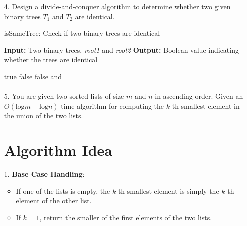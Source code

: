 \documentclass{article}
\begin{document}
\begin{itemize}
\item[4.] Design a divide-and-conquer algorithm to determine whether two given binary trees $T_1$ and $T_2$ are identical.

\begin{center}
\begin{algorithm}
  \caption{isSameTree: Check if two binary trees are identical}
  \begin{algorithmic}[1] %
      \State \textbf{Input:} Two binary trees, \textit{root1} and \textit{root2}
      \State \textbf{Output:} Boolean value indicating whether the trees are identical
  
              \State \Return true
          \EndIf %
              \State \Return false
          \EndIf
              \State \Return false
          \EndIf
          \State \Return {} and 
      \EndFunction %
  \end{algorithmic}
  \end{algorithm}

\end{center}
  \paragraph{ }

\item[5.] You are given two sorted lists of size $m$ and $n$ in ascending order. Given an $O(\mbox{log}m + \mbox{log}n)$ time algorithm for computing the $k$-th smallest element in the union of the two lists.




\section*{Algorithm Idea}

1. \textbf{Base Case Handling}:
   \begin{itemize}
       \item If one of the lists is empty, the $k$-th smallest element is simply the $k$-th element of the other list.
       \item If $k = 1$, return the smaller of the first elements of the two lists.
   \end{itemize}


\end{itemize}
\end{document}
